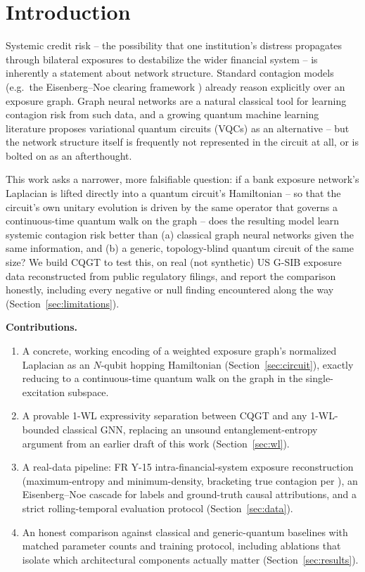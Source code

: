 \documentclass[journal]{IEEEtran}
\begin{document}
\section{Introduction}

Systemic credit risk -- the possibility that one institution's distress
propagates through bilateral exposures to destabilize the wider financial
system -- is inherently a statement about network structure. Standard
contagion models (e.g.\ the Eisenberg--Noe clearing framework
\cite{eisenberg2001}) already reason explicitly over an exposure graph.
Graph neural networks are a natural classical tool for learning contagion
risk from such data, and a growing quantum machine learning literature
proposes variational quantum circuits (VQCs) as an alternative -- but the
network structure itself is frequently not represented in the circuit at
all, or is bolted on as an afterthought.

This work asks a narrower, more falsifiable question: if a bank exposure
network's Laplacian is lifted directly into a quantum circuit's
Hamiltonian -- so that the circuit's own unitary evolution is driven by
the same operator that governs a continuous-time quantum walk on the
graph -- does the resulting model learn systemic contagion risk better
than (a) classical graph neural networks given the same information, and
(b) a generic, topology-blind quantum circuit of the same size? We build
CQGT to test this, on real (not synthetic) US G-SIB exposure data
reconstructed from public regulatory filings, and report the comparison
honestly, including every negative or null finding encountered along the
way (Section~\ref{sec:limitations}).

\textbf{Contributions.}
\begin{enumerate}
  \item A concrete, working encoding of a weighted exposure graph's
        normalized Laplacian as an $N$-qubit hopping Hamiltonian
        (Section~\ref{sec:circuit}), exactly reducing to a continuous-time
        quantum walk on the graph in the single-excitation subspace.
  \item A provable 1-WL expressivity separation between CQGT and any
        1-WL-bounded classical GNN, replacing an unsound
        entanglement-entropy argument from an earlier draft of this work
        (Section~\ref{sec:wl}).
  \item A real-data pipeline: FR Y-15 intra-financial-system exposure
        reconstruction (maximum-entropy and minimum-density, bracketing
        true contagion per \cite{anand2015}), an Eisenberg--Noe cascade
        for labels and ground-truth causal attributions, and a strict
        rolling-temporal evaluation protocol (Section~\ref{sec:data}).
  \item An honest comparison against classical and generic-quantum
        baselines with matched parameter counts and training protocol,
        including ablations that isolate which architectural components
        actually matter (Section~\ref{sec:results}).
\end{enumerate}
\end{document}
